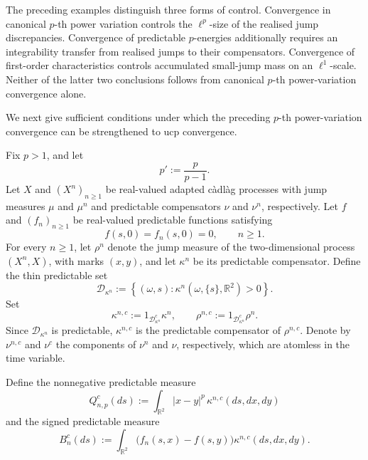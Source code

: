 \documentclass[a4paper,10pt]{article}
\begin{document}
The preceding examples distinguish three forms of control.
Convergence in canonical \(p\)-th power variation controls the
\(\ell^p\)-size of the realised jump discrepancies. Convergence of
predictable \(p\)-energies additionally requires an integrability
transfer from realised jumps to their compensators. Convergence of
first-order characteristics controls accumulated small-jump mass on
an \(\ell^1\)-scale. Neither of the latter two conclusions follows
from canonical \(p\)-th power-variation convergence alone.

We next give sufficient conditions under which the preceding
\(p\)-th power-variation convergence can be strengthened to ucp
convergence.

Fix \(p>1\), and let
\[
        p':=\frac{p}{p-1}.
\]
Let \(X\) and \((X^n)_{n\ge1}\) be real-valued adapted càdlàg
processes with jump measures \(\mu\) and \(\mu^n\) and predictable
compensators \(\nu\) and \(\nu^n\), respectively. Let \(f\) and
\((f_n)_{n\ge1}\) be real-valued predictable functions satisfying
\[
        f(s,0)=f_n(s,0)=0,
        \qquad n\ge1.
\]
For every \(n\ge1\), let \(\rho^n\) denote the jump measure of the
two-dimensional process \((X^n,X)\), with marks \((x,y)\), and let
\(\kappa^n\) be its predictable compensator. Define the thin predictable set
\[
\mathcal D_{\kappa^n}
:=
\left\{
(\omega,s):
\kappa^n(\omega,\{s\},\mathbb R^2)>0
\right\}.
\]
Set
\[
\kappa^{n,c}
:=
1_{\mathcal D_{\kappa^n}^c}\kappa^n,
\qquad
\rho^{n,c}
:=
1_{\mathcal D_{\kappa^n}^c}\rho^n.
\]
Since \(\mathcal D_{\kappa^n}\) is predictable,
\(\kappa^{n,c}\) is the predictable compensator of
\(\rho^{n,c}\). Denote by \(\nu^{n,c}\) and \(\nu^c\) the components
of \(\nu^n\) and \(\nu\), respectively, which are atomless in the time
variable.


Define the nonnegative predictable measure
\[
        Q_{n,p}^c(ds)
        :=
        \int_{\mathbb R^2}
        |x-y|^p\,\kappa^{n,c}(ds,dx,dy)
\]
and the signed predictable measure
\[
        B_n^c(ds)
        :=
        \int_{\mathbb R^2}
        \bigl(f_n(s,x)-f(s,y)\bigr)
        \kappa^{n,c}(ds,dx,dy).
\]
\end{document}
